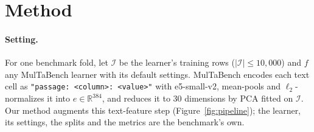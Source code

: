 \documentclass{article}
\begin{document}
\section{Method}
\label{sec:method}


\paragraph{Setting.}
For one benchmark fold, let $\mathcal{I}$ be the learner's training rows ($|\mathcal{I}| \le 10{,}000$) and $f$ any
MulTaBench learner with its default settings. MulTaBench encodes each text cell as \texttt{"passage: <column>:
<value>"} with e5-small-v2, mean-pools and $\ell_2$-normalizes it into $e \in \mathbb{R}^{384}$, and reduces it to 30
dimensions by PCA fitted on $\mathcal{I}$. Our method augments this text-feature step (Figure~\ref{fig:pipeline}); the learner,
its settings, the splits and the metrics are the benchmark's own.
\end{document}
